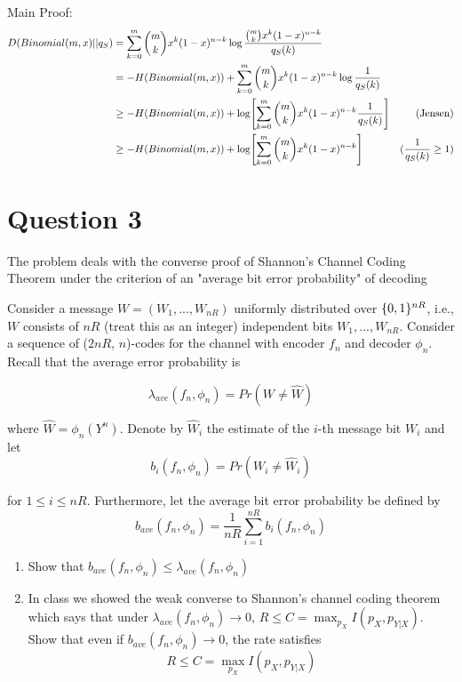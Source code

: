 \documentclass{article}
\begin{document}
Main Proof: 
\begin{align*}
    D(Binomial(m, x) || q_S)
    &= \sum_{k=0}^m {m \choose k} x^k (1-x)^{n-k} \log \frac{{m \choose k} x^k (1-x)^{n-k}}{q_S(k)} \\
    &= - H(Binomial(m, x)) + \sum_{k=0}^m {m \choose k} x^k (1-x)^{n-k} \log \frac{1}{q_S(k)} \\
    &\geq - H(Binomial(m, x)) + \log \bracket*{\sum_{k=0}^m {m \choose k} x^k (1-x)^{n-k} \frac{1}{q_S(k)}} &\text{(Jensen)} \\
    &\geq - H(Binomial(m, x)) + \log \bracket*{\sum_{k=0}^m {m \choose k} x^k (1-x)^{n-k}} &\text{($\frac{1}{q_S(k)} \geq 1$)} \\
\end{align*}


\section{Question 3}
The problem deals with the converse proof of Shannon's Channel Coding Theorem under the criterion of an "average bit error probability" of decoding

Consider a message $W = (W_1, ... , W_{nR})$ uniformly distributed over $\{0, 1\}^{nR}$, i.e., $W$ consists of $nR$ (treat this as an integer) independent bits $W_1, ... , W_{nR}$. Consider a sequence of ($2nR$, $n$)-codes for the channel with encoder $f_n$ and decoder $\phi_n$. Recall that the average error probability is

$$
    \lambda_{ave} (f_n, \phi_n) = Pr(W \neq \hat{W})
$$

where $\hat{W} = \phi_n(Y^n)$. Denote by $\hat{W}_i$ the estimate of the $i$-th message bit $W_i$ and let 
$$
    b_i(f_n, \phi_n) = Pr(W_i \neq \hat{W}_i)
$$

for $1 \leq i \leq nR$. Furthermore, let the average bit error probability be defined by
$$
    b_{ave}(f_n, \phi_n) = \frac{1}{nR} \sum_{i=1}^{nR} b_i(f_n, \phi_n)
$$

\begin{enumerate}[label=(\alph*)]
    \item Show that $b_{ave}(f_n, \phi_n) \leq \lambda_{ave} (f_n, \phi_n)$

    \item In class we showed the weak converse to Shannon's channel coding theorem which says that under $\lambda_{ave} (f_n, \phi_n) \to 0$, $R \leq C = \max_{p_X} I(p_X, p_{Y|X})$. Show that even if $b_{ave}(f_n, \phi_n) \to 0$, the rate satisfies
    $$
        R \leq C = \max_{p_X} I(p_X, p_{Y|X})
    $$
\end{enumerate}
\end{document}
